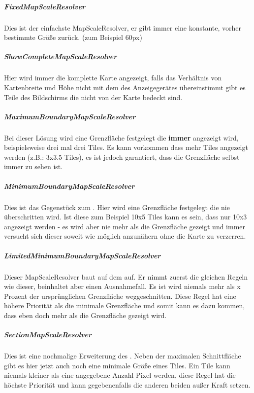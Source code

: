 \subparagraph{FixedMapScaleResolver} 
Dies ist der einfachste MapScaleResolver, er gibt immer eine konstante, vorher bestimmte Größe zurück. (zum Beispiel 60px)

  
\subparagraph{ShowCompleteMapScaleResolver} 
Hier wird immer die komplette Karte angezeigt, falls das Verhältnis von Kartenbreite und Höhe nicht mit dem des Anzeigegerätes übereinstimmt gibt es Teile des Bildschirms die nicht von der Karte bedeckt sind.

  
\subparagraph{MaximumBoundaryMapScaleResolver} 
Bei dieser Lösung wird eine Grenzfläche festgelegt die \textbf{immer} angezeigt wird, beispielsweise drei mal drei Tiles. 
Es kann vorkommen dass mehr Tiles angezeigt werden (z.B.: 3x3.5 Tiles), es ist jedoch garantiert, dass die Grenzfläche selbst immer zu sehen ist.

  
\subparagraph{MinimumBoundaryMapScaleResolver} 
Dies ist das Gegenstück zum . 
Hier wird eine Grenzfläche festgelegt die nie überschritten wird. 
Ist diese zum Beispiel 10x5 Tiles kann es sein, dass nur 10x3 angezeigt werden - es wird aber nie mehr als die Grenzfläche gezeigt und immer versucht sich dieser soweit wie möglich anzunähern ohne die Karte zu verzerren.

  
\subparagraph{LimitedMinimumBoundaryMapScaleResolver} 
Dieser MapScaleResolver baut auf dem  auf. 
Er nimmt zuerst die gleichen Regeln wie dieser, beinhaltet aber einen Ausnahmefall. 
Es ist wird niemals mehr als x Prozent der ursprünglichen Grenzfläche weggeschnitten. 
Diese Regel hat eine höhere Priorität als die minimale Grenzfläche und somit kann es dazu kommen, dass eben doch mehr als die Grenzfläche gezeigt wird.

  
\subparagraph{SectionMapScaleResolver} 
Dies ist eine nochmalige Erweiterung des . 
Neben der maximalen Schnittfläche gibt es hier jetzt auch noch eine minimale Größe eines Tiles. 
Ein Tile kann niemals kleiner als eine angegebene Anzahl Pixel werden, diese Regel hat die höchste Priorität und kann gegebenenfalls die anderen beiden außer Kraft setzen.

